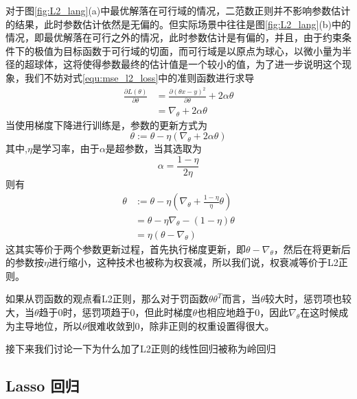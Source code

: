 对于图\ref{fig:L2_lang}(a)中最优解落在可行域的情况，二范数正则并不影响参数估计的结果，此时参数估计依然是无偏的。但实际场景中往往是图\ref{fig:L2_lang}(b)中的情况，即最优解落在可行之外的情况，此时参数估计是有偏的，并且，由于约束条件下的极值为目标函数于可行域的切面，而可行域是以原点为球心，以微小量为半径的超球体，这将使得参数最终的估计值是一个较小的值，为了进一步说明这个现象，我们不妨对式\ref{equ:mse_l2_loss}中的准则函数进行求导
\begin{equation}
\begin{split}
	\frac{\partial L(\theta)}{\partial \theta} &= \frac{\partial(\theta x - y)^2}{\partial \theta} + 2\alpha \theta\\
	&= \nabla_{\theta} + 2\alpha \theta
\end{split}
\end{equation}
当使用梯度下降进行训练是，参数的更新方式为
\begin{equation}
	\theta := \theta -\eta (\nabla_{\theta} + 2\alpha \theta)
\end{equation}
其中,$\eta$是学习率，由于$\alpha$是超参数，当其选取为
\begin{equation}
	\alpha = \frac{1 - \eta}{2\eta}
\end{equation}
则有
\begin{equation}
\begin{split}
	\theta &:= \theta -\eta (\nabla_{\theta} + \frac{1-\eta}{\eta} \theta)\\
	&= \theta - \eta\nabla_{\theta} - (1-\eta)\theta\\
	&=\eta(\theta - \nabla_{\theta})
 \end{split}
\end{equation}
这其实等价于两个参数更新过程，首先执行梯度更新，即$\theta - \nabla_{\theta}$，然后在将更新后的参数按$\eta$进行缩小，这种技术也被称为权衰减，所以我们说，权衰减等价于L2正则。

如果从罚函数的观点看L2正则，那么对于罚函数$\theta\theta^T$而言，当$\theta$较大时，惩罚项也较大，当$\theta$趋于0时，惩罚项趋于0，但此时梯度$\theta$也相应地趋于0，因此$\nabla_{\theta}$在这时候成为主导地位，所以$\theta$很难收敛到0，除非正则的权重设置得很大。

接下来我们讨论一下为什么加了L2正则的线性回归被称为岭回归











\subsection{Lasso 回归} %
\label{sub:lasso_回归}

